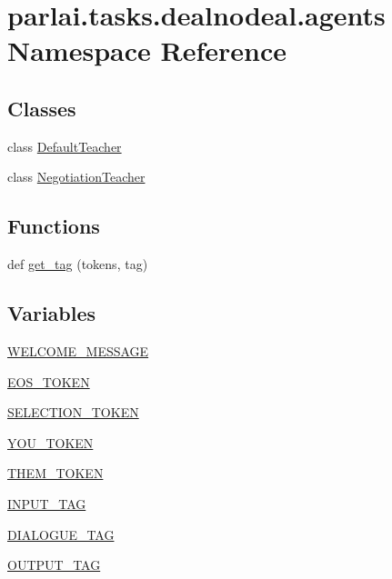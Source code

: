 \hypertarget{namespaceparlai_1_1tasks_1_1dealnodeal_1_1agents}{}\section{parlai.\+tasks.\+dealnodeal.\+agents Namespace Reference}
\label{namespaceparlai_1_1tasks_1_1dealnodeal_1_1agents}
\subsection*{Classes}
\begin{DoxyCompactItemize}
\item 
class \hyperlink{classparlai_1_1tasks_1_1dealnodeal_1_1agents_1_1DefaultTeacher}{Default\+Teacher}
\item 
class \hyperlink{classparlai_1_1tasks_1_1dealnodeal_1_1agents_1_1NegotiationTeacher}{Negotiation\+Teacher}
\end{DoxyCompactItemize}
\subsection*{Functions}
\begin{DoxyCompactItemize}
\item 
def \hyperlink{namespaceparlai_1_1tasks_1_1dealnodeal_1_1agents_a7a1e5d8435af234bbf07491e866bb1fd}{get\+\_\+tag} (tokens, tag)
\end{DoxyCompactItemize}
\subsection*{Variables}
\begin{DoxyCompactItemize}
\item 
\hyperlink{namespaceparlai_1_1tasks_1_1dealnodeal_1_1agents_ad5ddea83c4a4e8db44b80efa709118a7}{W\+E\+L\+C\+O\+M\+E\+\_\+\+M\+E\+S\+S\+A\+GE}
\item 
\hyperlink{namespaceparlai_1_1tasks_1_1dealnodeal_1_1agents_af1fd2f5f0a4dbc3efeae490d5b5177f2}{E\+O\+S\+\_\+\+T\+O\+K\+EN}
\item 
\hyperlink{namespaceparlai_1_1tasks_1_1dealnodeal_1_1agents_ae85ed76547eb0290aab9a1389a1f7693}{S\+E\+L\+E\+C\+T\+I\+O\+N\+\_\+\+T\+O\+K\+EN}
\item 
\hyperlink{namespaceparlai_1_1tasks_1_1dealnodeal_1_1agents_ad02be685921fbdb874b67145bee2af04}{Y\+O\+U\+\_\+\+T\+O\+K\+EN}
\item 
\hyperlink{namespaceparlai_1_1tasks_1_1dealnodeal_1_1agents_aa8befdfbe2fc54f542920c128761a7be}{T\+H\+E\+M\+\_\+\+T\+O\+K\+EN}
\item 
\hyperlink{namespaceparlai_1_1tasks_1_1dealnodeal_1_1agents_a16e0e0e4bc1d12e7c04a66eb5c72a563}{I\+N\+P\+U\+T\+\_\+\+T\+AG}
\item 
\hyperlink{namespaceparlai_1_1tasks_1_1dealnodeal_1_1agents_aaadb052506eb0ff949ab5700d6e7d83d}{D\+I\+A\+L\+O\+G\+U\+E\+\_\+\+T\+AG}
\item 
\hyperlink{namespaceparlai_1_1tasks_1_1dealnodeal_1_1agents_ad2629733c479e38ab88194cf02f84da0}{O\+U\+T\+P\+U\+T\+\_\+\+T\+AG}
\end{DoxyCompactItemize}


